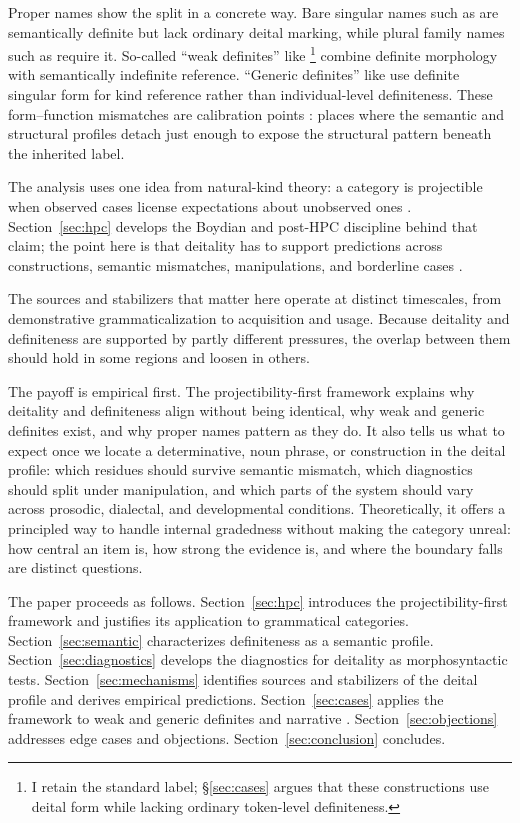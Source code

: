 \documentclass[12pt,letterpaper]{article}
\begin{document}
Proper names show the split in a concrete way. Bare singular names such as  are semantically definite but lack ordinary deital marking, while plural family names such as  require it. So-called \enquote{weak definites} like \footnote{I retain the standard label; §\ref{sec:cases} argues that these constructions use deital form while lacking ordinary token-level definiteness.} combine definite morphology with semantically indefinite reference. \enquote{Generic definites} like  use definite singular form for kind reference rather than individual-level definiteness. These form--function mismatches are calibration points \parencite{FrancisMichaelis2003}: places where the semantic and structural profiles detach just enough to expose the structural pattern beneath the inherited label.

The analysis uses one idea from natural-kind theory: a category is projectible when observed cases license expectations about unobserved ones \parencite{goodman1983}. Section~\ref{sec:hpc} develops the Boydian and post-HPC discipline behind that claim; the point here is that deitality has to support predictions across constructions, semantic mismatches, manipulations, and borderline cases \parencite{boyd1991,boyd1999}.

The sources and stabilizers that matter here operate at distinct timescales, from demonstrative grammaticalization to acquisition and usage. Because deitality and definiteness are supported by partly different pressures, the overlap between them should hold in some regions and loosen in others.

The payoff is empirical first. The projectibility-first framework explains why deitality and definiteness align without being identical, why weak and generic definites exist, and why proper names pattern as they do. It also tells us what to expect once we locate a determinative, noun phrase, or construction in the deital profile: which residues should survive semantic mismatch, which diagnostics should split under manipulation, and which parts of the system should vary across prosodic, dialectal, and developmental conditions. Theoretically, it offers a principled way to handle internal gradedness without making the category unreal: how central an item is, how strong the evidence is, and where the boundary falls are distinct questions.

The paper proceeds as follows. Section~\ref{sec:hpc} introduces the projectibility-first framework and justifies its application to grammatical categories. Section~\ref{sec:semantic} characterizes definiteness as a semantic profile. Section~\ref{sec:diagnostics} develops the diagnostics for deitality as morphosyntactic tests. Section~\ref{sec:mechanisms} identifies sources and stabilizers of the deital profile and derives empirical predictions. Section~\ref{sec:cases} applies the framework to weak and generic definites and narrative . Section~\ref{sec:objections} addresses edge cases and objections. Section~\ref{sec:conclusion} concludes.
\end{document}
